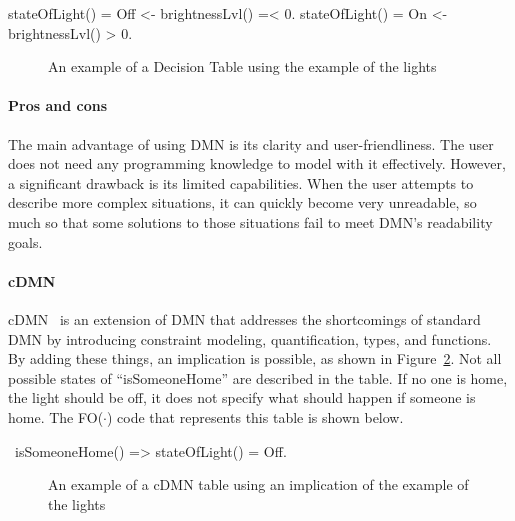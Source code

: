 \documentclass[11pt,a4paper]{report}
\newcommand{\fodot}{FO($\cdot$)\xspace}
\begin{document}
\begin{idplisting}
{
   stateOfLight() = Off <- brightnessLvl() =< 0.
   stateOfLight() = On <- brightnessLvl() > 0.
}
\end{idplisting}

\begin{figure}
    \centering
    \caption{An example of a Decision Table using the example of the lights}
    \label{fig:DT}
\end{figure}

\paragraph{ Pros and cons}
The main advantage of using DMN is its clarity and user-friendliness. The user does not need any programming knowledge to model with it effectively. However, a significant drawback is its limited capabilities. When the user attempts to describe more complex situations, it can quickly become very unreadable, so much so that some solutions to those situations fail to meet DMN's readability goals.
 
\paragraph{cDMN}
cDMN~\cite{cDMN} is an extension of DMN that addresses the shortcomings of standard DMN by introducing constraint modeling, quantification, types, and functions. By adding these things, an implication is possible, as shown in Figure~\ref{fig:cDMNTable}. Not all possible states of ``isSomeoneHome'' are described in the table. If no one is home, the light should be off, it does not specify what should happen if someone is home. The \fodot code that represents this table is shown below.
 
\begin{idplisting}
~isSomeoneHome() => stateOfLight() = Off.
\end{idplisting}

\begin{figure}
    \centering
    \caption{An example of a cDMN table using an implication of the example of the lights}
    \label{fig:cDMNTable}
\end{figure}
 
\end{document}
